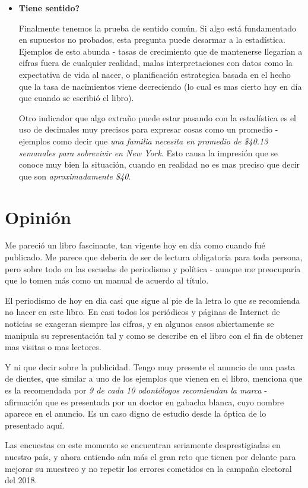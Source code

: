 \documentclass[letterpaper, 11pt]{article}
\begin{document}
\begin{itemize}
	\item \textbf{Tiene sentido?}
	
	Finalmente tenemos la prueba de sentido común. Si algo está fundamentado en supuestos no probados, esta pregunta puede desarmar a la estadística. Ejemplos de esto abunda - tasas de crecimiento que de mantenerse llegarían a cifras fuera de cualquier realidad, malas interpretaciones con datos como la expectativa de vida al nacer, o planificación estrategica basada en el hecho que la tasa de nacimientos viene decreciendo (lo cual es mas cierto hoy en día que cuando se escribió el libro).
	
	Otro indicador que algo extraño puede estar pasando con la estadística es el uso de decimales muy precisos para expresar cosas como un promedio - ejemplos como decir que \textit{una familia necesita en promedio de \$40.13 semanales para sobrevivir en New York}. Esto causa la impresión que se conoce muy bien la situación, cuando en realidad no es mas preciso que decir que son \textit{aproximadamente \$40}.
	
\end{itemize}

\section*{Opinión}

Me pareció un libro fascinante, tan vigente hoy en día como cuando fué publicado. Me parece que deberia de ser de lectura obligatoria para toda persona, pero sobre todo en las escuelas de periodismo y política - aunque me preocuparía que lo tomen más como un manual de acuerdo al título.

El periodismo de hoy en dia casi que sigue al pie de la letra lo que se recomienda no hacer en este libro. En casi todos los periódicos y páginas de Internet de noticias se exageran siempre las cifras, y en algunos casos abiertamente se manipula su representación tal y como se describe en el libro con el fin de obtener mas visitas o mas lectores.

Y ni que decir sobre la publicidad. Tengo muy presente el anuncio de una pasta de dientes, que similar a uno de los ejemplos que vienen en el libro, menciona que es la recomendada por \textit{9 de cada 10 odontólogos recomiendan la marca} - afirmación que es presentada por un doctor en gabacha blanca, cuyo nombre aparece en el anuncio. Es un caso digno de estudio desde la óptica de lo presentado aquí.

Las encuestas en este momento se encuentran seriamente desprestigiadas en nuestro país, y ahora entiendo aún más el gran reto que tienen por delante para mejorar su muestreo y no repetir los errores cometidos en la campaña electoral del 2018.
\end{document}
